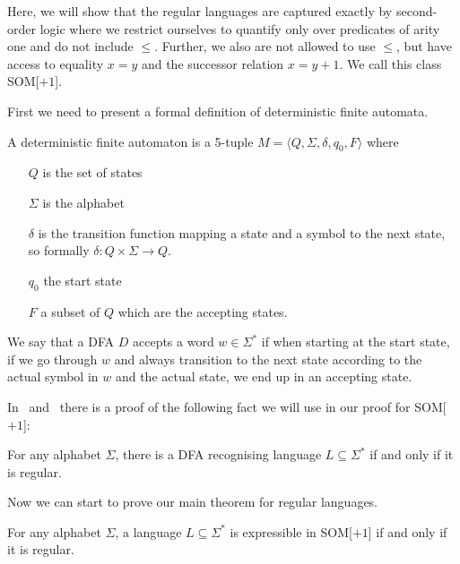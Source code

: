Here, we will show that the regular languages are captured exactly by second-order logic where we restrict ourselves to quantify only over predicates of arity one and do not include $\leq$.
Further, we also are not allowed to use $\leq$, but have access to equality $x = y$ and the successor relation $x = y + 1$.
We call this class SOM[$+1$].

First we need to present a formal definition of deterministic finite automata.
\begin{define}[DFA]
    A deterministic finite automaton is a 5-tuple $M = \langle Q, \Sigma, \delta, q_0,  F \rangle$ where
    \begin{itemize}
        \setlength\itemsep{0.2em}
        \item[$Q$] is the set of states
        \item[$\Sigma$] is the alphabet
        \item[$\delta$] is the transition function mapping a state and a symbol to the next state, so formally $\delta : Q\times \Sigma \to Q$.
        \item[$q_0$] the start state
        \item[$F$] a subset of $Q$ which are the accepting states.
    \end{itemize}
\end{define}
We say that a DFA $D$ accepts a word $w \in \Sigma^{*}$ if when starting at the start state, if we go through $w$ and always transition to the next state according to the actual symbol in $w$ and the actual state, we end up in an accepting state.

In~\cite{theory-cs} and~\cite{Straubing1994} there is a proof of the following fact we will use in our proof for SOM[$+1$]:
\begin{theorem}
    For any alphabet $\Sigma$, there is a DFA recognising language $L \subseteq \Sigma^{*}$ if and only if it is regular.
\end{theorem}

Now we can start to prove our main theorem for regular languages.
\begin{theorem}
    For any alphabet $\Sigma$, a language $L \subseteq \Sigma^{*}$ is expressible in SOM[$+1$] if and only if it is regular.
\end{theorem}


